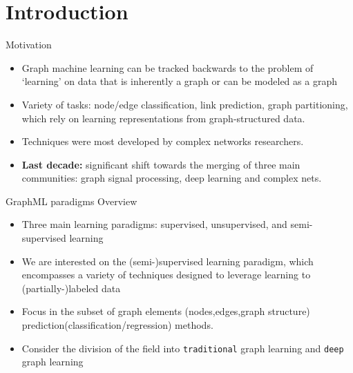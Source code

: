 \section{Introduction}

\begin{frame}{Motivation}
\begin{itemize}
    \item Graph machine learning can be tracked backwards to the problem of `learning' on data that is inherently a graph \cite{silva2016machine, JMLR:Perozzi} or can be modeled as a graph \cite{verri2013,grape2020}
    \item Variety of tasks:  node/edge classification, link prediction, graph partitioning, which rely on learning representations from graph-structured data.
    \item  Techniques were most developed by complex networks researchers.
    \item \textbf{Last decade:} significant shift towards the merging of three main communities: graph signal processing, deep learning and complex nets.
    
\end{itemize}
\end{frame}

\begin{frame}{GraphML paradigms Overview}
    \begin{itemize}
        \item Three main learning paradigms: supervised, unsupervised, and semi-supervised learning
        \item We are interested on the (semi-)supervised learning paradigm, which encompasses a variety of techniques designed to leverage learning to (partially-)labeled data \cite{verri2018advantages,amanciof}
        \item  Focus in the subset of graph elements (nodes,edges,graph structure) prediction(classification/regression) methods.
        \item Consider the division of the field into \texttt{traditional} graph learning and \texttt{deep} graph learning
        
    \end{itemize}
    \end{frame}

